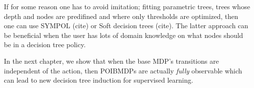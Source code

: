 If for some reason one has to avoid imitation; fitting parametric trees, trees whose depth and nodes are predifined and where only thresholds are optimized, then one can use SYMPOL (cite) or Soft decision trees (cite).
The latter approach can be beneficial when the user has lots of domain knowledge on what nodes should be in a decision tree policy.

In the next chapter, we show that when the base MDP's transitions are independent of the action, then POIBMDPs are actually \textit{fully} observable which can lead to new decision tree induction for supervised learning.